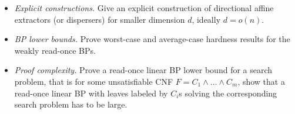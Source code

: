 \documentclass[a4paper,11pt,draft]{article}
\newtheorem{lemma}[theorem]{Lemma}
\theoremstyle{definition}
\newtheorem{definition}[theorem]{Definition}
\theoremstyle{remark}
\DeclareMathOperator{\supp}{supp}
\newcommand{\Q}{{\{0,1\}}}
\newcommand{\bbF}{\mathbb{F}}
\newcommand{\restr}[2]{\left.#1\right|_{#2}}
\newcommand{\wreadonce}{weakly read-once}
\newcommand{\readonce}{read-once}
\begin{document}
\begin{itemize}
    \item \emph{Explicit constructions.} Give an explicit construction of directional affine extractors (or dispersers) for smaller dimension $d$, ideally $d = o(n)$.

    \item \emph{BP lower bounds.} Prove worst-case and average-case hardness results for the \wreadonce{} BPs.

    \item \emph{Proof complexity.} Prove a \readonce{} linear BP lower bound for a search problem, that is for some unsatisfiable CNF $F = C_1 \wedge \ldots \wedge C_m$, show that a \readonce{} linear BP with leaves labeled by $C_i$s solving the corresponding search problem has to be large.
\end{itemize}








\end{document}

